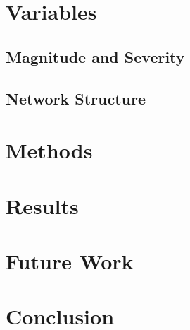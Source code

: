 \documentclass[letterpaper]{article}
\begin{document}
\section{Variables}
\subsection{Magnitude and Severity} \label{variables_nikete}


\subsection{Network Structure}


\section{Methods }


\section{Results}




\section{Future Work}


\section{Conclusion}


%
%






%



%
%
\end{document}
